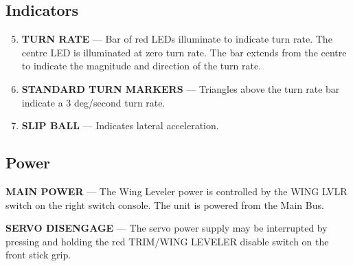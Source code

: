 \subsection*{Indicators} 
\begin{enumerate}
\setcounter{enumi}{4} 
\item \textbf{TURN RATE} --- Bar of red LEDs illuminate to indicate turn rate. The centre LED is illuminated at zero turn rate. The bar extends from the centre to indicate the magnitude and direction of the turn rate. 
\item \textbf{STANDARD TURN MARKERS} --- Triangles above the turn rate bar indicate a 3 deg/second turn rate. 
\item \textbf{SLIP BALL} --- Indicates lateral acceleration. 
\end{enumerate}

\subsection*{Power}

\textbf{MAIN POWER} --- The Wing Leveler power is controlled by the WING LVLR switch on the right switch console. The unit is powered from the Main Bus.

\textbf{SERVO DISENGAGE} --- The servo power supply may be interrupted by pressing and holding the red TRIM/WING LEVELER disable switch on the front stick grip. %



